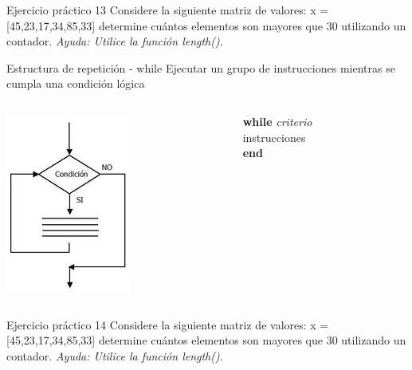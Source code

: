 \documentclass{bredelebeamer}
\begin{document}
\begin{frame}{Ejercicio práctico 13}
Considere la siguiente matriz de valores: x = [45,23,17,34,85,33] determine cuántos elementos son mayores que 30 utilizando un contador. \textit{Ayuda: Utilice la función length().}
\end{frame}

\begin{frame}{Estructura de repetición - while}
Ejecutar un grupo de instrucciones mientras se cumpla una condición lógica
\begin{columns}
\begin{column}{0.5\textwidth}
\begin{center}
\includegraphics[scale=0.7]{images/pantalla9.png}
\end{center}
\end{column}
\begin{column}{0.3\textwidth}
\textbf{while} \textit{criterio}\\
   instrucciones\\
\textbf{end}
\end{column}
\end{columns}
\end{frame}

\begin{frame}{Ejercicio práctico 14}
Considere la siguiente matriz de valores: x = [45,23,17,34,85,33] determine cuántos elementos son mayores que 30 utilizando un contador. \textit{Ayuda: Utilice la función length().}
\end{frame}
\end{document}
